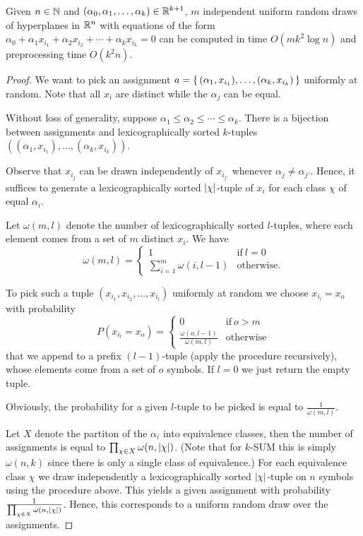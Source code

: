 \begin{lemma}
	Given $n\in\mathbb{N}$ and $(\alpha_0,\alpha_1,\ldots,\alpha_k) \in \mathbb{R}^{k+1}$,
	$m$ independent uniform random draws of
	hyperplanes in $\mathbb{R}^n$ with equations of the form
	$\alpha_0 + \alpha_1 x_{i_1} + \alpha_2 x_{i_2} + \cdots + \alpha_k x_{i_k} = 0$
	can be computed in time $O(mk^2 \log n)$
	and preprocessing time $O(k^2 n)$.
\end{lemma}
\begin{proof}
	We want to pick an assignment
	$a=\left\{\,{(\alpha_1,x_{i_1}),\ldots,(\alpha_k,x_{i_k})}\,\right\}$
	uniformly at random. Note that all $x_i$ are distinct while the $\alpha_j$
	can be equal.

	Without loss of generality, suppose $\alpha_1 \le \alpha_2 \le \cdots \le
	\alpha_k$. There is a bijection between assignments and lexicographically
	sorted $k$-tuples
	$((\alpha_1,x_{i_1}),\ldots,(\alpha_k,x_{i_k}))$.

	Observe that $x_{i_j}$ can be drawn independently of $x_{i_{j'}}$ whenever
	$\alpha_j \neq \alpha_{j'}$. Hence, it suffices to generate a lexicographically sorted
	$|{\chi}|$-tuple of $x_i$ for each class $\chi$ of equal $\alpha_i$.

	Let $\omega(m,l)$ denote the number of lexicographically sorted $l$-tuples,
	where each element comes from a set of $m$ distinct $x_i$.
	We have
	$$
		\omega(m,l) = \begin{cases}
			1 & \text{if}\ l = 0\\
			\sum_{i=1}^{m}\omega(i,l-1) & \text{otherwise.}
		\end{cases}
	$$

	To pick such a tuple $(x_{i_1},x_{i_2},\ldots,x_{i_l})$ uniformly at random
	we choose $x_{i_l} = x_o$ with probability
	$$
		P(x_{i_l} = x_o) = \begin{cases}
			0 & \text{if}\ o > m\\
			\frac{\omega(o,l-1)}{\omega(m,l)} & \text{otherwise}
		\end{cases}
	$$
	that we append to a prefix $(l-1)$-tuple (apply the procedure recursively),
	whose elements come from a set of $o$ symbols. If $l=0$ we just
	return the empty tuple.

	Obviously, the probability for a given $l$-tuple to be picked is equal to
	$\frac{1}{\omega(m,l)}$.

	Let $X$ denote the partiton of the $\alpha_i$ into equivalence classes,
	then the number of
	assignments is equal to $\prod_{\chi \in X}\omega(n,|{\chi}|)$.
	(Note that for $k$-SUM this is simply $\omega(n,k)$ since there is only a
	single class of equivalence.)
	For each equivalence class $\chi$ we draw independently a lexicographically
	sorted $|{\chi}|$-tuple on $n$ symbols using the procedure
	above. This yields a given assignment with probability
	$\frac{1}{\prod_{\chi \in X}\omega(n,|{\chi}|)}$.
	Hence, this corresponds to a uniform random draw over the assignments.


\end{proof}
